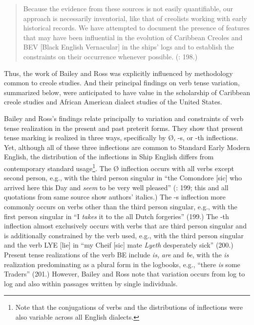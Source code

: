 \begin{quotation}
Because the evidence from these sources is not easily quantifiable, our approach is necessarily inventorial, like that of creolists working with early historical records. We have attempted to document the presence of features that may have been influential in the evolution of Caribbean Creoles and BEV [Black English Vernacular] in the ships’ logs and to establish the constraints on their occurrence whenever possible. (\citealt{BaileyRoss1988}: 198.) \end{quotation}

Thus, the work of Bailey and Ross was explicitly influenced by methodology common to creole studies. And their principal findings on verb tense variation, summarized below, were anticipated to have value in the scholarship of Caribbean creole studies and African American dialect studies of the United States.

Bailey and Ross’s findings relate principally to variation and constraints of verb tense realization in the present and past preterit forms. They show that present tense marking is realized in three ways, specifically by Ø, -s, or -th inflections. Yet, although all of these three inflections are common to Standard Early Modern English, the distribution of the inflections in Ship English differs from contemporary standard usage\footnote{Note that the conjugations of verbs and the distributions of inflections were also variable across all English dialects.}. The Ø inflection occurs with all verbs except second person, e.g., with the third person singular in “the Comondore [sic] who arrived here this Day and \textit{seem} to be very well pleased” (\citealt{BaileyRoss1988}: 199; this and all quotations from same source show authors’ italics.) The -s inflection more commonly occurs on verbs other than the third person singular, e.g., with the first person singular in “I \textit{takes} it to the all Dutch forgeries” (199.) The -th inflection almost exclusively occurs with verbs that are third person singular and is additionally constrained by the verb used, e.g., with the third person singular and the verb LYE [lie] in “my Cheif [sic] mate \textit{Lyeth} desperately sick” (200.) Present tense realizations of the verb BE include \textit{is,} \textit{are} and \textit{be}, with the \textit{is} realization predominating as a plural form in the logbooks, e.g., “there \textit{is} some Traders” (201.) However, Bailey and Ross note that variation occurs from log to log and also within passages written by single individuals. 


